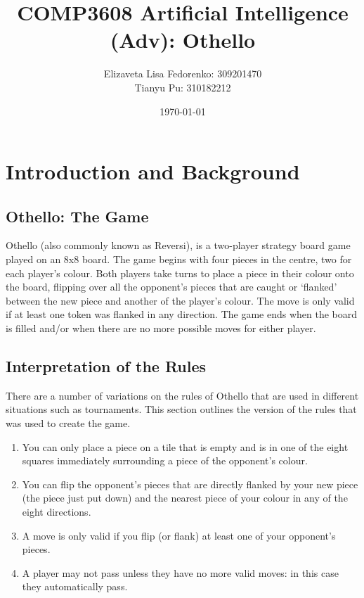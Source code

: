 \documentclass[12pt]{article}
\title{COMP3608 Artificial Intelligence (Adv): Othello}
\author{Elizaveta Lisa Fedorenko: 309201470
\\ Tianyu Pu: 310182212}
\date{\today}
\begin{document}
\maketitle

\begin{abstract}
\end{abstract}

\section{Introduction and Background}
\subsection{Othello: The Game}
Othello (also commonly known as Reversi), is a two-player strategy board game played on an 8x8 board.
The game begins with four pieces in the centre, two for each player's colour. Both players take turns
to place a piece in their colour onto the board, flipping over all the opponent's pieces that are caught
or `flanked' between the new piece and another of the player's colour. The move is only valid if at
least one token was flanked in any direction. The game ends when the board is filled and/or when there are
no more possible moves for either player.

\subsection{Interpretation of the Rules}
There are a number of variations on the rules of Othello that are used in different situations such as
tournaments. This section outlines the version of the rules that was used to create the game.
\begin{enumerate}
 \item You can only place a piece on a tile that is empty and is in one of the eight squares immediately
 surrounding a piece of the opponent's colour.
 \item You can flip the opponent's pieces that are directly flanked by your new piece (the piece just
 put down) and the nearest piece of your colour in any of the eight directions.
 \item A move is only valid if you flip (or flank) at least one of your opponent's pieces.
 \item A player may not pass unless they have no more valid moves: in this case they automatically pass.
\end{enumerate}
\end{document}
